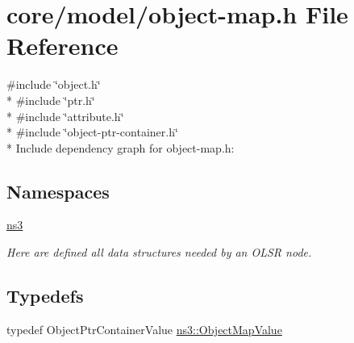 \hypertarget{object-map_8h}{}\section{core/model/object-\/map.h File Reference}
\label{object-map_8h}
{\ttfamily \#include \char`\"{}object.\+h\char`\"{}}\\*
{\ttfamily \#include \char`\"{}ptr.\+h\char`\"{}}\\*
{\ttfamily \#include \char`\"{}attribute.\+h\char`\"{}}\\*
{\ttfamily \#include \char`\"{}object-\/ptr-\/container.\+h\char`\"{}}\\*
Include dependency graph for object-\/map.h\+:
\subsection*{Namespaces}
\begin{DoxyCompactItemize}
\item 
 \hyperlink{namespacens3}{ns3}
\begin{DoxyCompactList}\small\item\em Here are defined all data structures needed by an O\+L\+SR node. \end{DoxyCompactList}\end{DoxyCompactItemize}
\subsection*{Typedefs}
\begin{DoxyCompactItemize}
\item 
typedef Object\+Ptr\+Container\+Value \hyperlink{namespacens3_a5cac680c954929d49b48f4c40c1a2e08}{ns3\+::\+Object\+Map\+Value}
\end{DoxyCompactItemize}
